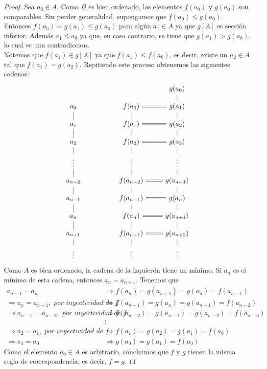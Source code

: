 \documentclass[12pt,letterpaper,titlepage]{article}
\theoremstyle{definition}
\newcommand\<{\langle}
\renewcommand\>{\rangle}
\begin{document}
\begin{proof}
Sea $a_0\in A$. Como $B$ es bien ordenado, los elementos $f(a_0)$ y $g(a_0)$ son comparables. Sin perder generalidad, supongamos que $f(a_0)\leq g(a_0)$.\\
Entonces $f(a_0)=g(a_1)\leq g(a_0)$ para algún $a_1\in A$ ya que $g[A]$ es sección inferior. Además $a_1\leq a_0$ ya que, en caso contrario, se tiene que $g(a_1)>g(a_0)$, lo cual es una contradiccion.\\
Notemos que $f(a_1)\in g[A]$ ya que $f(a_1)\leq f(a_0)$, es decir, existe un $a_2\in A$ tal que $f(a_1)=g(a_2)$. Repitiendo este proceso obtenemos las siguientes cadenas:
\[
\begin{tikzcd}[row sep=3mm]
                  &  &                                & g(a_0)               \\
a_0               &  & f(a_0) \arrow[r,equal]               & g(a_1) \arrow[u,no head]     \\
a_1 \arrow[u,no head]     &  & f(a_1) \arrow[u,no head] \arrow[r,equal]     & g(a_2) \arrow[u,no head]     \\
a_2 \arrow[u,no head]     &  & f(a_2) \arrow[u,no head] \arrow[r,equal]     & g(a_3) \arrow[u,no head]     \\
\vdots \arrow[u,no head]  &  & \vdots \arrow[u,no head]               & \vdots \arrow[u,no head]     \\
a_{n-2} \arrow[u,no head] &  & f(a_{n-2}) \arrow[u,no head] \arrow[r,equal] & g(a_{n-1}) \arrow[u,no head] \\
a_{n-1} \arrow[u,no head] &  & f(a_{n-1}) \arrow[u,no head] \arrow[r,equal] & g(a_n) \arrow[u,no head]     \\
a_{n} \arrow[u,no head]   &  & f(a_n) \arrow[u,no head] \arrow[r,equal]     & g(a_{n+1}) \arrow[u,no head] \\
a_{n+1} \arrow[u,no head] &  & f(a_{n+1}) \arrow[u,no head] \arrow[r,equal] & g(a_{n+2}) \arrow[u,no head] \\
\vdots \arrow[u,no head]  &  & \vdots \arrow[u,no head]               & \vdots \arrow[u,no head]    
\end{tikzcd}
\]
Como $A$ es bien ordenado, la cadena de la izquierda tiene un mínimo. Si $a_n$ es el mínimo de esta cadena, entonces $a_n=a_{n+1}$.
Tenemos que
\begin{align*}
a_{n+1}=a_n&\Rightarrow f(a_n)=g(a_{n+1})=g(a_n)=f(a_{n-1})\\
\Rightarrow a_n=a_{n-1}, \textit{ por inyectividad de f}&\Rightarrow f(a_{n-1})=g(a_n)=g(a_{n-1})=f(a_{n-2})\\
\Rightarrow a_{n-1}=a_{n-2},\textit{ por inyectividad de f}&\Rightarrow f(a_{n-2})=g(a_{n-1})=g(a_{n-2})=f(a_{n-3})\\
&\vdots\\
\Rightarrow a_2=a_1,\textit{ por inyectividad de f}&\Rightarrow f(a_1)=g(a_2)=g(a_1)=f(a_0)\\
\Rightarrow a_1=a_0&\Rightarrow g(a_0)=g(a_1)=f(a_0)
\end{align*}
Como el elemento $a_0\in A$ es arbitrario, concluimos que $f$ y $g$ tienen la misma regla de correspondencia, es decir, $f=g$.
\end{proof}
\end{document}
